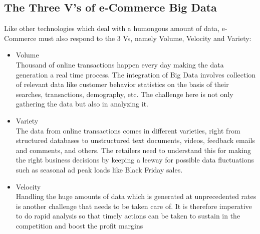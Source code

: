 \subsection{The Three V's of e-Commerce Big Data}
Like other technologies which deal with a humongous amount of data, e-Commerce must also respond to the 3 Vs, namely Volume, Velocity and Variety:
\begin{itemize}
    \item Volume \\
    Thousand of online transactions happen every day making the data generation a real time process. The integration of Big Data involves collection of relevant data like customer behavior statistics on the basis of their searches, transactions, demography, etc. The challenge here is not only gathering the data but also in analyzing it.
    \item Variety \\
    The data from online transactions comes in different varieties, right from structured databases to unstructured text documents, videos, feedback emails and comments, and others. The retailers need to understand this for making the right business decisions by keeping a leeway for possible data fluctuations such as seasonal ad peak loads like Black Friday sales.
    \item Velocity \\
    Handling the huge amounts of data which is generated at unprecedented rates is another challenge that needs to be taken care of. It is therefore imperative to do rapid analysis so that timely actions can be taken to sustain in the competition and boost the profit margins \cite{link4}
\end{itemize}

